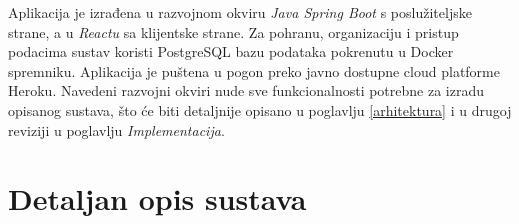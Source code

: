             \par {Aplikacija je izrađena u razvojnom okviru\textit{ Java Spring Boot} s poslužiteljske strane, a u \textit{Reactu} sa klijentske strane. Za pohranu, organizaciju i pristup podacima sustav koristi PostgreSQL bazu podataka pokrenutu u Docker spremniku. Aplikacija je puštena u pogon preko javno dostupne cloud platforme Heroku. Navedeni razvojni okviri nude sve funkcionalnosti potrebne za izradu opisanog sustava, što će biti detaljnije opisano u poglavlju \ref{arhitektura} i u drugoj reviziji u poglavlju \textit{Implementacija}. \\}
            
        \section{Detaljan opis sustava}
        
